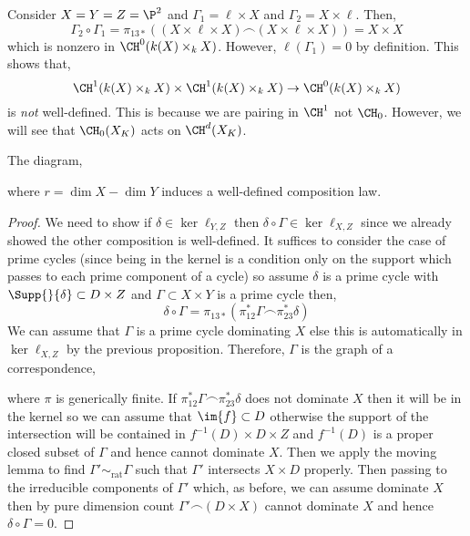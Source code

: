 \documentclass[12pt]{article}
\begin{document}
\begin{example}
Consider $X = Y = Z = \P^2$ and $\Gamma_1 = \ell \times X$ and $\Gamma_2 = X \times \ell$. Then,
\[ \Gamma_2 \circ \Gamma_1 = \pi_{13*}( (X \times \ell \times X) \frown (X \times \ell \times X)) = X \times X \]
which is nonzero in $\CH^0(k(X) \times_k X)$. However, $\ell(\Gamma_1) = 0$ by definition. This shows that,
\[ \CH^{1}(k(X) \times_k X) \times \CH^{1}(k(X) \times_k X) \to \CH^{0}(k(X) \times_k X) \]
is \textit{not} well-defined. This is because we are pairing in $\CH^{1}$ not $\CH_{0}$. However, we will see that $\CH_0(X_K)$ acts on $\CH^{d}(X_K)$.
\end{example}

\begin{prop}
The diagram,
\begin{center}
\end{center}
where $r = \dim{X} - \dim{Y}$ induces a well-defined composition law. 
\end{prop}

\begin{proof}
We need to show if $\delta \in \ker{\ell_{Y,Z}}$ then $\delta \circ \Gamma \in \ker{\ell_{X,Z}}$ since we already showed the other composition is well-defined. It suffices to consider the case of prime cycles (since being in the kernel is a condition only on the support which passes to each prime component of a cycle) so assume $\delta$ is a prime cycle with $\Supp{}{\delta} \subset D \times Z$ and $\Gamma \subset X \times Y$ is a prime cycle then,
\[ \delta \circ \Gamma = \pi_{13*}(\pi_{12}^* \Gamma \frown \pi_{23}^* \delta) \]
We can assume that $\Gamma$ is a prime cycle dominating $X$ else this is automatically in $\ker{\ell_{X,Z}}$ by the previous proposition. Therefore, $\Gamma$ is the graph of a correspondence,
\begin{center}
\end{center}
where $\pi$ is generically finite. If $\pi_{12}^* \Gamma \frown \pi_{23}^* \delta$ does not dominate $X$ then it will be in the kernel so we can assume that $\im{f} \subset D$ otherwise the support of the intersection will be contained in $f^{-1}(D) \times D \times Z$ and $f^{-1}(D)$ is a proper closed subset of $\Gamma$ and hence cannot dominate $X$. Then we apply the moving lemma to find $\Gamma' \sim_{\text{rat}} \Gamma$ such that $\Gamma'$ intersects $X \times D$ properly. Then passing to the irreducible components of $\Gamma'$ which, as before, we can assume dominate $X$ then by pure dimension count $\Gamma' \frown (D \times X)$ cannot dominate $X$ and hence $\delta \circ \Gamma = 0$.
\end{proof}
\end{document}
